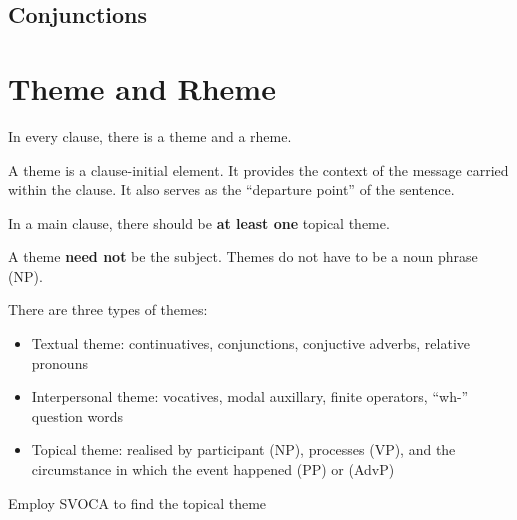 \documentclass[../main.tex]{subfiles}
\begin{document}
        \subsection{Conjunctions}

    \section{Theme and Rheme}
        In every clause, there is a theme and a rheme. 

        A theme is a clause-initial element. It provides the context of the message carried within the clause. It also serves as the ``departure point'' of the sentence.
        
        In a main clause, there should be \textbf{at least one} topical theme. 

        A theme \textbf{need not} be the subject. Themes do not have to be a noun phrase (NP).

        There are three types of themes:\begin{itemize}
            \item Textual theme: continuatives, conjunctions, conjuctive adverbs, relative pronouns
            \item Interpersonal theme: vocatives, modal auxillary, finite operators, ``wh-'' question words
            \item Topical theme: realised by participant (NP), processes (VP), and the circumstance in which the event happened (PP) or (AdvP)
        \end{itemize}
        Employ SVOCA to find the topical theme

\end{document}
